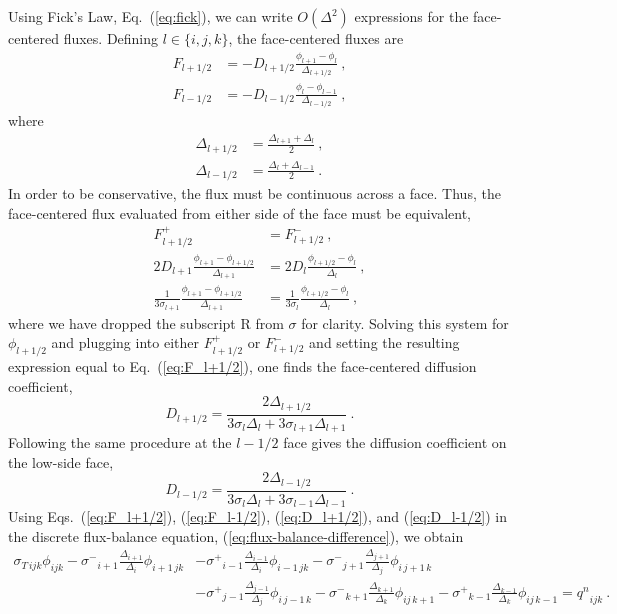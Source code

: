 \documentclass[preprint,12pt]{elsarticle}
\newcommand{\qn}{\ensuremath{q^n}}
\newcommand{\Di}{\ensuremath{\Delta_i}}
\newcommand{\Dj}{\ensuremath{\Delta_j}}
\newcommand{\Dk}{\ensuremath{\Delta_k}}
\newcommand{\sigT}{\ensuremath{\sigma_{T\,ijk}}}
\newcommand{\sigm}{\ensuremath{\sigma^{-}}}
\newcommand{\sigp}{\ensuremath{\sigma^{+}}}
\begin{document}
Using Fick's Law, Eq.~(\ref{eq:fick}), we can write $O(\Delta^2)$
expressions for the face-centered fluxes.  Defining $l\in\{i,j,k\}$,
the face-centered fluxes are
\begin{align}
  F_{l+1/2} &= -D_{l+1/2}\frac{\phi_{l+1} -
    \phi_{l}}{\Delta_{l+1/2}}\:, \label{eq:F_l+1/2}\\
  F_{l-1/2} &= -D_{l-1/2}\frac{\phi_{l} -
    \phi_{l-1}}{\Delta_{l-1/2}}\:, \label{eq:F_l-1/2}
\end{align}
where
\begin{align}
  \Delta_{l+1/2} &= \frac{\Delta_{l+1} + \Delta_{l}}{2}\:,\\
  \Delta_{l-1/2} &= \frac{\Delta_{l} + \Delta_{l-1}}{2}\:.
\end{align}
In order to be conservative, the flux must be continuous across a
face.  Thus, the face-centered flux evaluated from either side of the
face must be equivalent,
\begin{equation}
  \begin{aligned}
    F_{l+1/2}^{+} &= F_{l+1/2}^{-}\:,\\
    2D_{l+1}\frac{\phi_{l+1} - \phi_{l+1/2}}{\Delta_{l+1}} &=
    2D_{l}\frac{\phi_{l+1/2} - \phi_{l}}{\Delta_l}\:,\\
    \frac{1}{3\sigma_{l+1}}\frac{\phi_{l+1} - \phi_{l+1/2}}{\Delta_{l+1}} &=
    \frac{1}{3\sigma_{l}}\frac{\phi_{l+1/2} - \phi_{l}}{\Delta_l}\:,
  \end{aligned}
\end{equation}
where we have dropped the subscript $\mathrm{R}$ from $\sigma$ for
clarity.  Solving this system for $\phi_{l+1/2}$ and plugging into
either $F_{l+1/2}^{+}$ or $F_{l+1/2}^{-}$ and setting the resulting
expression equal to Eq.~(\ref{eq:F_l+1/2}), one finds the
face-centered diffusion coefficient,
\begin{equation}
  D_{l+1/2} = \frac{2\Delta_{l+1/2}}{3\sigma_l\Delta_l + 
    3\sigma_{l+1}\Delta_{l+1}}\:.
  \label{eq:D_l+1/2}
\end{equation}
Following the same procedure at the $l-1/2$ face gives the diffusion
coefficient on the low-side face,
\begin{equation}
  D_{l-1/2} = \frac{2\Delta_{l-1/2}}{3\sigma_l\Delta_l + 
    3\sigma_{l-1}\Delta_{l-1}}\:.
  \label{eq:D_l-1/2} 
\end{equation}
Using Eqs.~(\ref{eq:F_l+1/2}), (\ref{eq:F_l-1/2}), (\ref{eq:D_l+1/2}),
and (\ref{eq:D_l-1/2}) in the discrete flux-balance equation,
(\ref{eq:flux-balance-difference}), we obtain
\begin{equation}
  \begin{aligned}
    \sigT\phi_{ijk} 
    - \sigm_{i+1}\frac{\Delta_{i+1}}{\Di}\phi_{i+1\,jk} &
    - \sigp_{i-1}\frac{\Delta_{i-1}}{\Di}\phi_{i-1\,jk}
    - \sigm_{j+1}\frac{\Delta_{j+1}}{\Dj}\phi_{i\,j+1\,k} \\
    &- \sigp_{j-1}\frac{\Delta_{j-1}}{\Dj}\phi_{i\,j-1\,k} 
    - \sigm_{k+1}\frac{\Delta_{k+1}}{\Dk}\phi_{ij\,k+1}
    - \sigp_{k-1}\frac{\Delta_{k-1}}{\Dk}\phi_{ij\,k-1}
    = \qn_{ijk}\:.
  \end{aligned}
  \label{eq:discrete-diffusion}
\end{equation}
\end{document}
